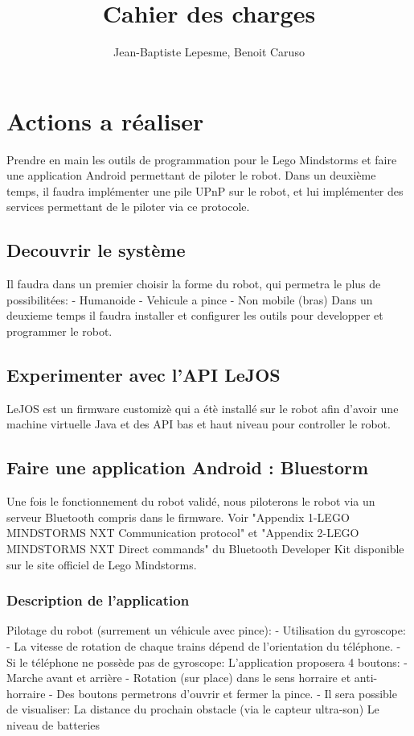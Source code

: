 \documentclass{article}
\title{Cahier des charges}
\author{Jean-Baptiste Lepesme, Benoit Caruso}
\date{}
\begin{document}
	
	\maketitle
	
	\tableofcontents
	
	\newpage
	
	\section{Actions a r\'ealiser}
		Prendre en main les outils de programmation pour le Lego Mindstorms et faire une application Android permettant de piloter le robot.
		Dans un deuxième temps, il faudra implémenter une pile UPnP sur le robot, et lui implémenter des services permettant de le piloter via ce protocole.
		\subsection{Decouvrir le syst\`eme}
			Il faudra dans un premier choisir la forme du robot, qui permetra le plus de possibilitées:
				- Humanoide
				- Vehicule a pince
				- Non mobile (bras)
			Dans un deuxieme temps il faudra installer et configurer les outils pour developper et programmer le robot.
		\subsection{Experimenter avec l'API LeJOS}
			LeJOS est un firmware customiz\`e qui a \'et\`e install\'e sur le robot afin d'avoir une machine virtuelle Java et des API bas et haut niveau pour controller le robot.
		\subsection{Faire une application Android : Bluestorm}
			Une fois le fonctionnement du robot validé, nous piloterons le robot via un serveur Bluetooth compris dans le firmware.
			Voir "Appendix 1-LEGO MINDSTORMS NXT Communication protocol" et "Appendix 2-LEGO MINDSTORMS NXT Direct commands" du Bluetooth Developer Kit disponible sur le site officiel de Lego Mindstorms.
			\subsubsection{Description de l'application}
				Pilotage du robot (surrement un v\'ehicule avec pince):
					- Utilisation du gyroscope:
						- La vitesse de rotation de chaque trains dépend de l'orientation du téléphone.
						- Si le téléphone ne possède pas de gyroscope:
							L'application proposera 4 boutons:
								- Marche avant et arri\`ere
								- Rotation (sur place) dans le sens horraire et anti-horraire
					- Des boutons permetrons d'ouvrir et fermer la pince.
					- Il sera possible de visualiser:
						La distance du prochain obstacle (via le capteur ultra-son)
						Le niveau de batteries
\end{document}
